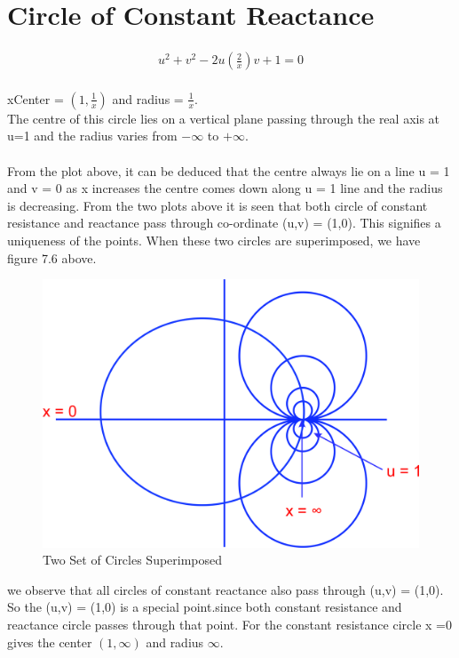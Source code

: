\section{Circle of Constant Reactance}
\begin{align*}
u^2+v^2-2u\left(\frac{2}{x}\right)v+1=0
\end{align*}\\
xCenter = $(1,\frac{1}{x})$ and radius = $\frac{1}{x}$. \\
The centre of this circle lies on a vertical plane passing through the real axis at u=1 and the radius varies from $-\infty$ to $+\infty$.\\\\
From the plot above, it can be deduced that the centre always lie on a line u = 1 and v = 0 as x increases the centre comes down along u = 1 line and the radius is decreasing.  
From the two plots above it is seen that both circle of constant resistance and reactance pass through co-ordinate (u,v) = (1,0). This signifies a uniqueness of the points.  When these two circles are superimposed, we have figure 7.6 above.
\begin{figure}[h]
\centering
\includegraphics[width=0.5\linewidth]{./graphics/uytrdbn}
\caption{Two Set of Circles Superimposed}
\label{fig:uytrdbn}
\end{figure}

we observe that all circles of constant reactance also pass through (u,v) = (1,0). So the (u,v) = (1,0) is a special point.since both constant resistance and reactance circle passes through that point. For the constant resistance circle x =0 gives the center $(1,\infty)$ and radius $\infty$. 

